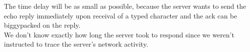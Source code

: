 The time delay will be as small as possible, because the server wants to send the echo reply
immediately upon receival of a typed character and the ack can be biggypacked on the reply. \\
We don't know exactly how long the server took to respond since we weren't instructed to trace the server's network activity.
